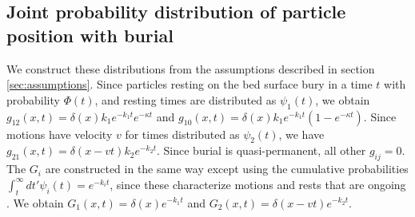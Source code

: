 \subsection{Joint probability distribution of particle position with burial}
\label{sec:solution}

We construct these distributions from the assumptions described in section \ref{sec:assumptions}.
Since particles resting on the bed surface bury in a time $t$ with probability $\Phi(t)$, and resting times are distributed as $\psi_1(t)$, we obtain $g_{12}(x,t) = \delta(x)k_1e^{-k_1t}e^{-\kappa t}$ and $g_{10}(x,t) = \delta(x) k_1 e^{-k_1 t}(1-e^{-\kappa t})$. Since motions have velocity $v$ for times distributed as $\psi_2(t)$, we have $g_{21}(x,t) = \delta(x-vt)k_2e^{-k_2 t}$.
Since burial is quasi-permanent, all other $g_{ij} = 0$.
The $G_i$ are constructed in the same way except using the cumulative probabilities $\int_t^\infty dt'\psi_i(t) = e^{-k_i t}$, since these characterize motions and rests that are ongoing \citep{Weiss1994}.
We obtain $G_1(x,t) = \delta(x)e^{-k_1t}$ and $G_2(x,t) = \delta(x-vt)e^{-k_2 t}$.

